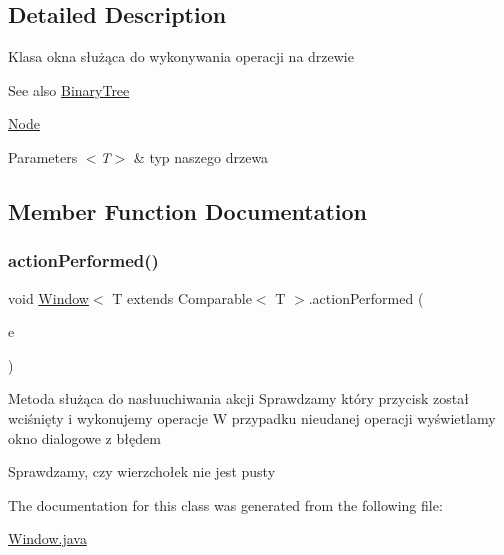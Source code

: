 \subsection{Detailed Description}
Klasa okna służąca do wykonywania operacji na drzewie \begin{DoxySeeAlso}{See also}
\hyperlink{classBinaryTree}{Binary\+Tree} 

\hyperlink{classNode}{Node} 
\end{DoxySeeAlso}

\begin{DoxyParams}{Parameters}
{\em $<$\+T$>$} & typ naszego drzewa \\
\hline
\end{DoxyParams}


\subsection{Member Function Documentation}
\mbox{\label{classWindow_aa0461cd99d9f9019c64d5e68dad1bead}} 
\subsubsection{\texorpdfstring{action\+Performed()}{actionPerformed()}}
{\footnotesize\ttfamily void \hyperlink{classWindow}{Window}$<$ T extends Comparable$<$ T $>$.action\+Performed (\begin{DoxyParamCaption}\item[{Action\+Event}]{e }\end{DoxyParamCaption})\hspace{0.3cm}{\ttfamily [inline]}}

Metoda służąca do nasłuuchiwania akcji Sprawdzamy który przycisk został wciśnięty i wykonujemy operacje W przypadku nieudanej operacji wyświetlamy okno dialogowe z błędem

Sprawdzamy, czy wierzchołek nie jest pusty 

The documentation for this class was generated from the following file\+:\begin{DoxyCompactItemize}
\item 
\hyperlink{Window_8java}{Window.\+java}\end{DoxyCompactItemize}
